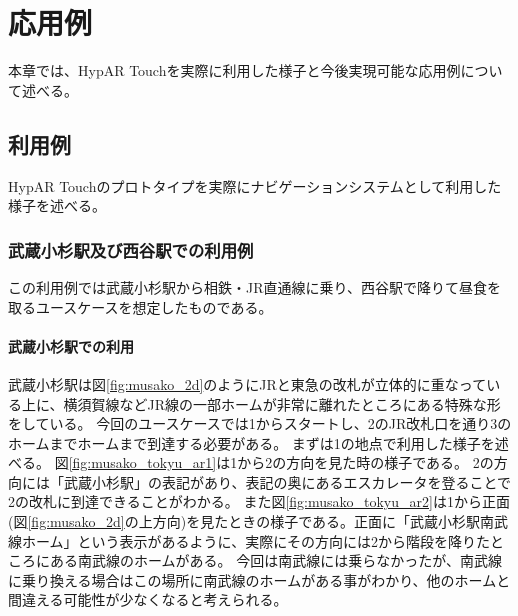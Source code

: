 \chapter{応用例}
\label{chap:usage}

本章では、HypAR Touchを実際に利用した様子と今後実現可能な応用例について述べる。

\newpage

\section{利用例}
HypAR Touchのプロトタイプを実際にナビゲーションシステムとして利用した様子を述べる。

\subsection{武蔵小杉駅及び西谷駅での利用例}
この利用例では武蔵小杉駅から相鉄・JR直通線に乗り、西谷駅で降りて昼食を取るユースケースを想定したものである。

\subsubsection{武蔵小杉駅での利用}
武蔵小杉駅は図\ref{fig:musako_2d}のようにJRと東急の改札が立体的に重なっている上に、横須賀線などJR線の一部ホームが非常に離れたところにある特殊な形をしている。
今回のユースケースでは\textcircled{\scriptsize{1}}からスタートし、\textcircled{\scriptsize{2}}のJR改札口を通り\textcircled{\scriptsize{3}}のホームまでホームまで到達する必要がある。
まずは\textcircled{\scriptsize{1}}の地点で利用した様子を述べる。
図\ref{fig:musako_tokyu_ar1}は\textcircled{\scriptsize{1}}から\textcircled{\scriptsize{2}}の方向を見た時の様子である。
\textcircled{\scriptsize{2}}の方向には「武蔵小杉駅」の表記があり、表記の奥にあるエスカレータを登ることで\textcircled{\scriptsize{2}}の改札に到達できることがわかる。
また図\ref{fig:musako_tokyu_ar2}は\textcircled{\scriptsize{1}}から正面(図\ref{fig:musako_2d}の上方向)を見たときの様子である。正面に「武蔵小杉駅南武線ホーム」という表示があるように、実際にその方向には\textcircled{\scriptsize{2}}から階段を降りたところにある南武線のホームがある。
今回は南武線には乗らなかったが、南武線に乗り換える場合はこの場所に南武線のホームがある事がわかり、他のホームと間違える可能性が少なくなると考えられる。

